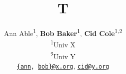 \documentclass{article}
\begin{document}
\title{T}
\author{Ann Able\textsuperscript{1}, \textbf{Bob Baker}\textsuperscript{1}, \textbf{Cid Cole}\textsuperscript{1,2}\\
\textsuperscript{1}Univ X\\
\textsuperscript{2}Univ Y\\
\texttt{\href{mailto:ann@x.org}{\{ann}, \href{mailto:bob@x.org}{bob\}@x.org}},
     \texttt{\href{mailto:cid@y.org}{cid@y.org}}
}
\maketitle
\end{document}
